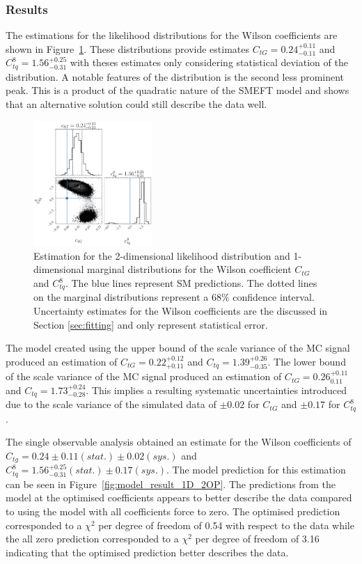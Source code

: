 \documentclass[a4paper,11pt]{article}
\begin{document}
\subsubsection{Results}

The estimations for the likelihood distributions for the Wilson coefficients are shown in Figure~\ref{fig:corner_1D_2OP}.
These distributions provide estimates $C_{tG}=0.24^{+0.11}_{-0.11}$ and $C_{tq}^{8}=1.56^{+0.25}_{-0.31}$ with theses estimates only considering statistical deviation of the distribution.
A notable features of the distribution is the second less prominent peak.
This is a product of the quadratic nature of the SMEFT model and shows that an alternative solution could still describe the data well.

\begin{figure}[htb]
    \centering
    \includegraphics[width=0.4\textwidth]{plots/ATLAS-ctg-ctq8_1D_2OP.png}
    \caption{Estimation for the 2-dimensional likelihood distribution and 1-dimensional marginal distributions for the Wilson coefficient $C_{tG}$ and $C_{tq}^{8}$. The blue lines represent SM predictions. The dotted lines on the marginal distributions represent a 68\% confidence interval. Uncertainty estimates for the Wilson coefficients are the discussed in Section \ref{sec:fitting} and only represent statistical error.}
    \label{fig:corner_1D_2OP}
\end{figure}

The model created using the upper bound of the scale variance of the MC signal produced an estimation of $C_{tG}=0.22^{+0.12}_{+0.11}$ and $C_{tq}=1.39_{-0.35}^{+0.26}$.
The lower bound of the scale variance of the MC signal produced an estimation of $C_{tG}=0.26^{+0.11}_{0.11}$ and $C_{tq}=1.73_{-0.28}^{+0.24}$.
This implies a resulting systematic uncertainties introduced due to the scale variance of the simulated data of $\pm0.02$ for $C_{tG}$ and $\pm0.17$ for $C_{tq}^{8}$.

The single observable analysis obtained an estimate for the Wilson coefficients of $C_{tg} = 0.24 \pm 0.11 (stat.) \pm 0.02 (sys.)$ and $C_{tq}^{8}=1.56^{+0.25}_{-0.31} (stat.) \pm 0.17 (sys.)$.
The model prediction for this estimation can be seen in Figure~\ref{fig:model_result_1D_2OP}.
The predictions from the model at the optimised coefficients appears to better describe the data compared to using the model with all coefficients force to zero.
The optimised prediction corresponded to a $\chi^{2}$ per degree of freedom of 0.54 with respect to the data while the all zero prediction corresponded to a $\chi^{2}$ per degree of freedom of 3.16 indicating that the optimised prediction better describes the data.
\end{document}
